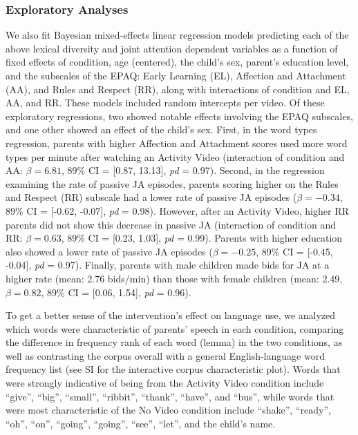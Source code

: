 \documentclass[man,floatsintext]{apa6}
\begin{document}
\hypertarget{exploratory-analyses}{%
\subsubsection{Exploratory Analyses}\label{exploratory-analyses}}

We also fit Bayesian mixed-effects linear regression models predicting each of the above lexical diversity and joint attention dependent variables as a function of fixed effects of condition, age (centered), the child's sex, parent's education level, and the subscales of the EPAQ: Early Learning (EL), Affection and Attachment (AA), and Rules and Respect (RR), along with interactions of condition and EL, AA, and RR.
These models included random intercepts per video.
Of these exploratory regressions, two showed notable effects involving the EPAQ subscales, and one other showed an effect of the child's sex.
First, in the word types regression, parents with higher Affection and Attachment scores used more word types per minute after watching an Activity Video (interaction of condition and AA: \(\beta=6.81\), 89\% CI = {[}0.87, 13.13{]}, \emph{pd} = 0.97).
Second, in the regression examining the rate of passive JA episodes, parents scoring higher on the Rules and Respect (RR) subscale had a lower rate of passive JA episodes (\(\beta=-0.34\), 89\% CI = {[}-0.62, -0.07{]}, \emph{pd} = 0.98).
However, after an Activity Video, higher RR parents did not show this decrease in passive JA (interaction of condition and RR: \(\beta=0.63\), 89\% CI = {[}0.23, 1.03{]}, \emph{pd} = 0.99).
Parents with higher education also showed a lower rate of passive JA episodes (\(\beta=-0.25\), 89\% CI = {[}-0.45, -0.04{]}, \emph{pd} = 0.97).
Finally, parents with male children made bids for JA at a higher rate (mean: 2.76 bids/min) than those with female children (mean: 2.49, \(\beta=0.82\), 89\% CI = {[}0.06, 1.54{]}, \emph{pd} = 0.96).

To get a better sense of the intervention's effect on language use, we analyzed which words were characteristic of parents' speech in each condition, comparing the difference in frequency rank of each word (lemma) in the two conditions, as well as contrasting the corpus overall with a general English-language word frequency list (see SI for the interactive corpus characteristic plot).
Words that were strongly indicative of being from the Activity Video condition include \enquote{give}, \enquote{big}, \enquote{small}, \enquote{ribbit}, \enquote{thank}, \enquote{have}, and \enquote{bus}, while words that were most characteristic of the No Video condition include \enquote{shake}, \enquote{ready}, \enquote{oh}, \enquote{on}, \enquote{going}, \enquote{going}, \enquote{see}, \enquote{let}, and the child's name.
\end{document}

